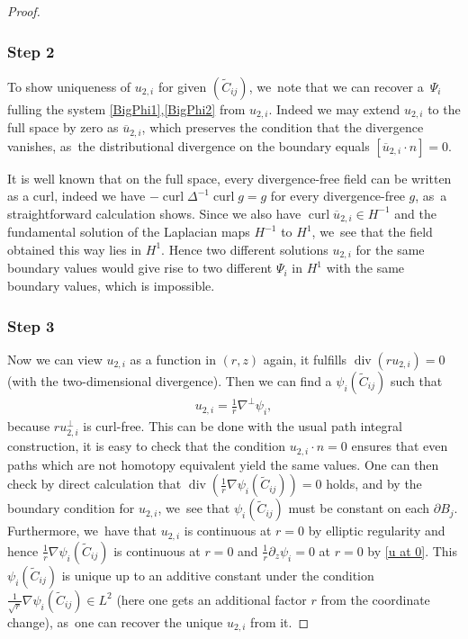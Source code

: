 \documentclass[10pt]{amsart}
\theoremstyle{definition}
\renewcommand{\div}{\operatorname{div}}
\DeclareMathOperator{\curl}{curl}
\newcommand\eq{=}
\let\de\partial
\begin{document}
\begin{proof}
\subsubsection*{Step 2} To show uniqueness of $u_{2,i}$ for given $(\tilde{C}_{ij})$, we~note that we can recover a~$\Psi_i$ fulling the system \eqref{BigPhi1},\eqref{BigPhi2} from $u_{2,i}$. Indeed we may extend $u_{2,i}$ to the full space by zero as $\overline{u}_{2,i}$, which preserves the condition that the divergence vanishes, as~the distributional divergence on the boundary equals $[\overline{u}_{2,i}\cdot n]=0$.

It is well known that on the full space, every divergence-free field can be written as a curl, indeed we have $-\curl\Delta^{-1}\curl g=g$ for every divergence-free $g$, as~a straightforward calculation shows.
Since we also have $\curl \overline{u}_{2,i}\in H^{-1}$ and the fundamental solution of the Laplacian maps $H^{-1}$ to $H^{1}$, we~see that the field obtained this way lies in $H^1$.
Hence two different solutions $u_{2,i}$ for the same boundary values would give rise to two different $\Psi_i$ in $H^1$ with the same boundary values, which is impossible.

\subsubsection*{Step 3} Now we can view $u_{2,i}$ as a function in $(r,z)$ again, it fulfills $\div(ru_{2,i})=0$ (with the two-dimensional divergence). Then we can find a $\psi_i(\tilde{C}_{ij})$ such that
\begin{align*}
u_{2,i}\eq\frac{1}{r}\nabla^\perp\psi_i,
\end{align*}
because $ru_{2,i}^\perp$ is curl-free. This can be done with the usual path integral construction, it is easy to check that the condition $u_{2,i}\cdot n=0$ ensures that even paths which are not homotopy equivalent yield the same values. One can then check by direct calculation that $\div(\frac{1}{r}\nabla\psi_i(\tilde{C}_{ij}))=0$ holds, and by the boundary condition for $u_{2,i}$, we~see that $\psi_i(\tilde{C}_{ij})$ must be constant on each $\de B_j$. Furthermore, we~have that $u_{2,i}$ is continuous at $r=0$ by elliptic regularity and hence $\frac{1}{r}\nabla\psi_i(\tilde{C}_{ij})$ is continuous at $r=0$ and $\frac{1}{r}\de_z\psi_i=0$ at $r=0$ by \eqref{u at 0}.
This $\psi_i(\tilde{C}_{ij})$ is unique up to an additive constant under the condition $\frac{1}{\sqrt{r}}\nabla\psi_i(\tilde{C}_{ij})\in L^2$ (here one gets an additional factor $r$ from the coordinate change), as~one can recover the unique $u_{2,i}$ from it.


\end{proof}
\end{document}
